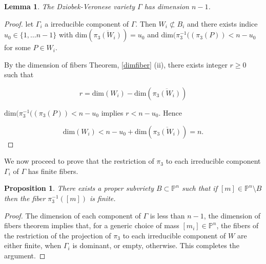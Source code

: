 \documentclass{amsart}
\newtheorem{proposition}[theorem]{Proposition}
\newtheorem{lemma}[theorem]{Lemma}
\theoremstyle{definition}
\theoremstyle{remark}
\numberwithin{equation}{section}
\begin{document}
\begin{lemma}
  The Dziobek-Veronese variety $\Gamma$ has dimension $n-1$.  
\end{lemma}
\begin{proof}
let $\Gamma_i$ a irreducible component of $\Gamma$. Then $W_i \not \subset B_i$ and there exists indice  $u_0 \in \{1,\dots n-1\}$ with  $\text{dim}(\overline{\pi_3(W_i)})=u_0$ and 
$\text{dim}(\pi_3^{-1}((\pi_3(P)) < n-u_0$ for some $P \in W_i$.


 By the dimension of fibers Theorem, \ref{dimfiber}  (ii), there exists integer $r \geq 0$ such that

$$r=\text{dim}(W_i)-\text{dim}(\overline{\pi_3(W_i)})$$

$\text{dim}(\pi_3^{-1}((\pi_3(P)) < n-u_0$ implies $r < n-u_0$. Hence

$$\text{dim}(W_i) < n-u_0+\text{dim}(\overline{\pi_3(W_i)})=n.$$
\end{proof}


We now proceed to prove that the restriction of $\pi_3$ to each irreducible component $\Gamma_i$ of $\Gamma$ has finite fibers.

\begin{proposition} \label{fincomplex}
   There exists a proper subvriety $B \subset \mathbb{P}^{n}$ such that if $[m] \in  \mathbb{P}^{n} \setminus B$ then the fiber $\pi_{3}^{-1}([m])$ is finite. 
\end{proposition}
\begin{proof} The dimension of each component of $\Gamma$ is less than $n-1$, the dimension of fibers theorem implies that, for a generic choice of mass \( [m_i] \in \mathbb{P}^{n} \), the fibers of the restriction of the projection of $\pi_3$ to each irreducible component of $W$ are either finite, when $\Gamma_i$ is dominant, or empty, otherwise. This completes the argument.
\end{proof}
\end{document}

